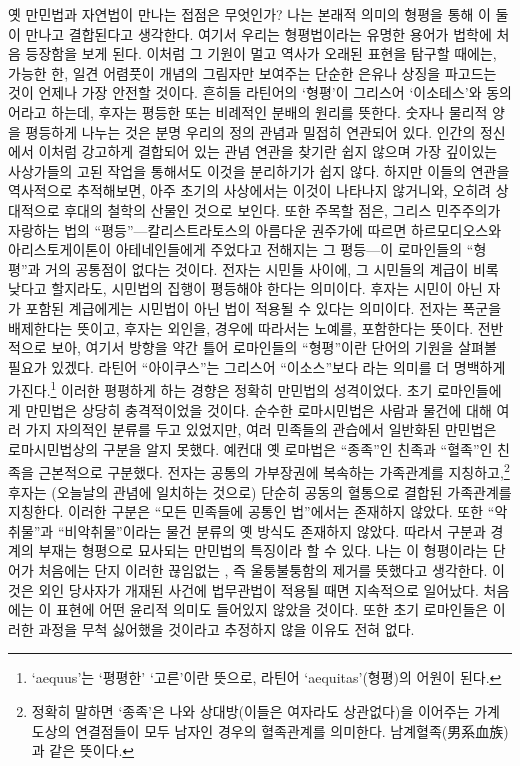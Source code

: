옛 만민법과 자연법이 만나는 접점은 무엇인가?
나는 본래적 의미의 형평을 통해
이 둘이 만나고 결합된다고 생각한다.
여기서 우리는 형평법이라는 유명한 용어가
법학에 처음 등장함을 보게 된다.
이처럼 그 기원이 멀고 역사가 오래된 표현을 탐구할 때에는,
가능한 한,
일견 어렴풋이 개념의 그림자만 보여주는
단순한 은유나 상징을 파고드는 것이
언제나 가장 안전할 것이다.
흔히들 라틴어의 `형평'이 그리스어 `이소테스'와 동의어라고
하는데, 후자는 평등한 또는 비례적인 분배의 원리를 뜻한다.
숫자나 물리적 양을 평등하게 나누는 것은 분명 우리의 정의 관념과
밀접히 연관되어 있다.
인간의 정신에서 이처럼 강고하게 결합되어 있는 관념 연관을 찾기란 쉽지 않으며
가장 깊이있는 사상가들의 고된 작업을 통해서도 이것을 분리하기가 쉽지 않다.
하지만 이들의 연관을 역사적으로 추적해보면,
아주 초기의 사상에서는 이것이 나타나지 않거니와,
오히려 상대적으로 후대의 철학의 산물인 것으로 보인다.
또한 주목할 점은, 그리스 민주주의가 자랑하는
법의 ``평등''---칼리스트라토스의
아름다운 권주가에 따르면
하르모디오스와 아리스토게이톤이
아테네인들에게 주었다고 전해지는 그 평등---이
로마인들의 ``형평''과 거의 공통점이 없다는 것이다.
전자는 시민들 사이에, 그 시민들의 계급이 비록 낮다고 할지라도,
시민법의 집행이 평등해야 한다는 의미이다.
후자는 시민이 아닌 자가 포함된 계급에게는 시민법이 아닌 법이
적용될 수 있다는 의미이다.
전자는 폭군을 배제한다는 뜻이고, 후자는 외인을, 경우에 따라서는 노예를,
포함한다는 뜻이다.
전반적으로 보아, 여기서 방향을 약간 틀어 로마인들의 ``형평''이란 단어의
기원을 살펴볼 필요가 있겠다.
라틴어 ``아이쿠스''는 그리스어 ``이소스''보다
라는 의미를 더 명백하게 가진다.\footnote{%
  `aequus'는 `평평한' `고른'이란 뜻으로, 라틴어 `aequitas'(형평)의 어원이 된다.}
이러한 평평하게 하는 경향은 정확히 만민법의 성격이었다.
초기 로마인들에게 만민법은 상당히 충격적이었을 것이다.
순수한 로마시민법은 사람과 물건에 대해 여러 가지 자의적인 분류를 두고 있었지만,
여러 민족들의 관습에서 일반화된 만민법은 로마시민법상의 구분을
알지 못했다.
예컨대 옛 로마법은 ``종족''인 친족과
``혈족''인 친족을 근본적으로 구분했다.
전자는 공통의 가부장권에 복속하는 가족관계를
지칭하고,\footnote{정확히 말하면 `종족'은
나와 상대방(이들은 여자라도 상관없다)을 이어주는 가계도상의 연결점들이
모두 남자인 경우의 혈족관계를 의미한다. 남계혈족(男系血族)과 같은 뜻이다.}
후자는 {\small (오늘날의 관념에 일치하는 것으로)} 단순히 공동의 혈통으로
결합된 가족관계를 지칭한다.
이러한 구분은 ``모든 민족들에 공통인 법''에서는 존재하지 않았다.
또한 ``악취물''과
``비악취물''이라는
물건 분류의 옛 방식도 존재하지 않았다.
따라서 구분과 경계의 부재는 형평으로 묘사되는 만민법의
특징이라 할 수 있다.
나는 이 형평이라는 단어가 처음에는 단지
이러한 끊임없는 , 즉
울퉁불퉁함의 제거를 뜻했다고 생각한다.
이것은 외인 당사자가 개재된 사건에 법무관법이 적용될 때면 지속적으로 일어났다.
처음에는 이 표현에 어떤 윤리적 의미도 들어있지 않았을 것이다.
또한 초기 로마인들은 이러한 과정을 무척 싫어했을 것이라고
추정하지 않을 이유도 전혀 없다.

